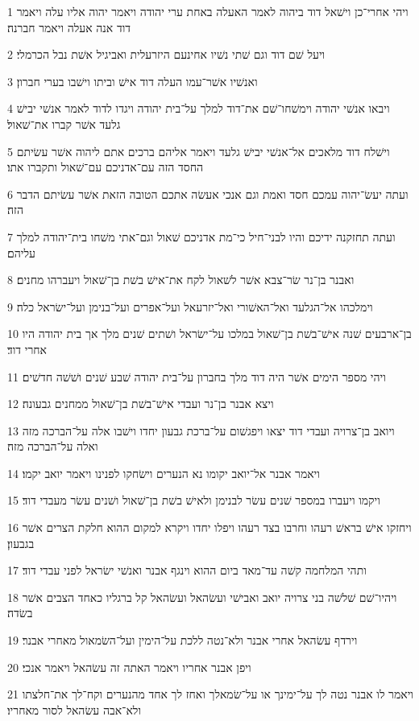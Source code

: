 \par 1 ויהי אחרי־כן וישׁאל דוד ביהוה לאמר האעלה באחת ערי יהודה ויאמר יהוה אליו עלה ויאמר דוד אנה אעלה ויאמר חברנה׃
\par 2 ויעל שׁם דוד וגם שׁתי נשׁיו אחינעם היזרעלית ואביגיל אשׁת נבל הכרמלי׃
\par 3 ואנשׁיו אשׁר־עמו העלה דוד אישׁ וביתו וישׁבו בערי חברון׃
\par 4 ויבאו אנשׁי יהודה וימשׁחו־שׁם את־דוד למלך על־בית יהודה ויגדו לדוד לאמר אנשׁי יבישׁ גלעד אשׁר קברו את־שׁאול׃
\par 5 וישׁלח דוד מלאכים אל־אנשׁי יבישׁ גלעד ויאמר אליהם ברכים אתם ליהוה אשׁר עשׂיתם החסד הזה עם־אדניכם עם־שׁאול ותקברו אתו׃
\par 6 ועתה יעשׂ־יהוה עמכם חסד ואמת וגם אנכי אעשׂה אתכם הטובה הזאת אשׁר עשׂיתם הדבר הזה׃
\par 7 ועתה תחזקנה ידיכם והיו לבני־חיל כי־מת אדניכם שׁאול וגם־אתי משׁחו בית־יהודה למלך עליהם׃
\par 8 ואבנר בן־נר שׂר־צבא אשׁר לשׁאול לקח את־אישׁ בשׁת בן־שׁאול ויעברהו מחנים׃
\par 9 וימלכהו אל־הגלעד ואל־האשׁורי ואל־יזרעאל ועל־אפרים ועל־בנימן ועל־ישׂראל כלה׃
\par 10 בן־ארבעים שׁנה אישׁ־בשׁת בן־שׁאול במלכו על־ישׂראל ושׁתים שׁנים מלך אך בית יהודה היו אחרי דוד׃
\par 11 ויהי מספר הימים אשׁר היה דוד מלך בחברון על־בית יהודה שׁבע שׁנים ושׁשׁה חדשׁים׃
\par 12 ויצא אבנר בן־נר ועבדי אישׁ־בשׁת בן־שׁאול ממחנים גבעונה׃
\par 13 ויואב בן־צרויה ועבדי דוד יצאו ויפגשׁום על־ברכת גבעון יחדו וישׁבו אלה על־הברכה מזה ואלה על־הברכה מזה׃
\par 14 ויאמר אבנר אל־יואב יקומו נא הנערים וישׂחקו לפנינו ויאמר יואב יקמו׃
\par 15 ויקמו ויעברו במספר שׁנים עשׂר לבנימן ולאישׁ בשׁת בן־שׁאול ושׁנים עשׂר מעבדי דוד׃
\par 16 ויחזקו אישׁ בראשׁ רעהו וחרבו בצד רעהו ויפלו יחדו ויקרא למקום ההוא חלקת הצרים אשׁר בגבעון׃
\par 17 ותהי המלחמה קשׁה עד־מאד ביום ההוא וינגף אבנר ואנשׁי ישׂראל לפני עבדי דוד׃
\par 18 ויהיו־שׁם שׁלשׁה בני צרויה יואב ואבישׁי ועשׂהאל ועשׂהאל קל ברגליו כאחד הצבים אשׁר בשׂדה׃
\par 19 וירדף עשׂהאל אחרי אבנר ולא־נטה ללכת על־הימין ועל־השׂמאול מאחרי אבנר׃
\par 20 ויפן אבנר אחריו ויאמר האתה זה עשׂהאל ויאמר אנכי׃
\par 21 ויאמר לו אבנר נטה לך על־ימינך או על־שׂמאלך ואחז לך אחד מהנערים וקח־לך את־חלצתו ולא־אבה עשׂהאל לסור מאחריו׃
